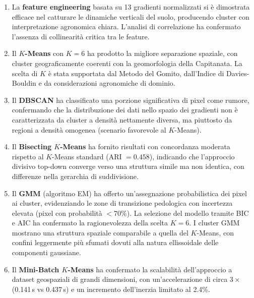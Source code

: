 \documentclass[a4paper,12pt]{article}
\newcommand{\kmeans}{$K$\nobreakdash-Means}
\newcommand{\kval}[1]{$K{=}#1$}
\begin{document}
\begin{enumerate}
    \item La \textbf{feature engineering} basata su 13
    gradienti normalizzati si è dimostrata efficace nel catturare le
    dinamiche verticali del suolo, producendo cluster con
    interpretazione agronomica chiara. L'analisi di correlazione ha
    confermato l'assenza di collinearità critica tra le feature.

    \item Il \textbf{\kmeans{}} con \kval{6} ha prodotto la migliore
    separazione spaziale, con cluster geograficamente coerenti con la
    geomorfologia della Capitanata. La scelta di $K$ è stata supportata
    dal Metodo del Gomito, dall'Indice di Davies-Bouldin e da
    considerazioni agronomiche di dominio.

    \item Il \textbf{DBSCAN} ha classificato una porzione significativa
    di pixel come rumore, confermando che la distribuzione dei dati nello
    spazio dei gradienti non è caratterizzata da cluster a densità
    nettamente diversa, ma piuttosto da regioni a densità omogenea
    (scenario favorevole al \kmeans{}).

    \item Il \textbf{Bisecting \kmeans{}} ha fornito risultati
    con concordanza moderata rispetto al \kmeans{} standard
    (ARI $= 0.458$), indicando che l'approccio divisivo top-down
    converge verso una struttura simile ma non identica, con
    differenze nella gerarchia di suddivisione.

    \item Il \textbf{GMM} (algoritmo EM) ha offerto un'assegnazione
    probabilistica dei pixel ai cluster, evidenziando le zone di
    transizione pedologica con incertezza elevata (pixel con probabilità
    $< 70\%$). La selezione del modello tramite BIC e AIC ha confermato
    la ragionevolezza della scelta $K=6$. I cluster GMM mostrano una
    struttura spaziale comparabile a quella del \kmeans{}, con confini
    leggermente più sfumati dovuti alla natura ellissoidale delle
    componenti gaussiane.

    \item Il \textbf{Mini-Batch \kmeans{}} ha confermato la scalabilità
    dell'approccio a dataset geospaziali di grandi dimensioni, con
    un'accelerazione di circa $3\times$ (0.141\,s vs 0.437\,s) e un
    incremento dell'inerzia limitato al 2.4\%.
\end{enumerate}
\end{document}
